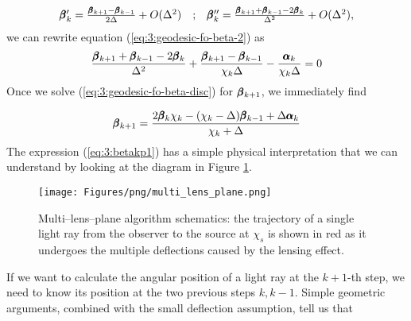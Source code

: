 \begin{equation}
\label{eq:3:finitediff}
\begin{matrix}
\pmb{\beta}'_k = \frac{\pmb{\beta}_{k+1}-\pmb{\beta}_{k-1}}{2\Delta} + O(\Delta^2) & ; & \pmb{\beta}''_k = \frac{\pmb{\beta}_{k+1}+\pmb{\beta}_{k-1}-2\pmb{\beta}_k}{\Delta^2} + O(\Delta^2),
\end{matrix}
\end{equation}
%
we can rewrite equation (\ref{eq:3:geodesic-fo-beta-2}) as 
\begin{equation}
\label{eq:3:geodesic-fo-beta-disc}
\frac{\pmb{\beta}_{k+1}+\pmb{\beta}_{k-1}-2\pmb{\beta}_k}{\Delta^2} + \frac{\pmb{\beta}_{k+1}-\pmb{\beta}_{k-1}}{\chi_k\Delta} - \frac{\pmb{\alpha}_k}{\chi_k\Delta} = 0
\end{equation} 
%
Once we solve (\ref{eq:3:geodesic-fo-beta-disc}) for $\pmb{\beta}_{k+1}$, we immediately find

\begin{equation}
\label{eq:3:betakp1}
\pmb{\beta}_{k+1} = \frac{2\pmb{\beta}_k\chi_k-(\chi_k-\Delta)\pmb{\beta}_{k-1}+\Delta\pmb{\alpha}_k}{\chi_k+\Delta}
\end{equation}  
%
The expression (\ref{eq:3:betakp1}) has a simple physical interpretation that we can understand by looking at the diagram in Figure \ref{fig:3:multi-lens-plane}.
\begin{figure}
\begin{center}
\texttt{[image: Figures/png/multi\_lens\_plane.png]}
\end{center}
\caption{Multi--lens--plane algorithm schematics: the trajectory of a single light ray from the observer to the source at $\chi_s$ is shown in red as it undergoes the multiple deflections caused by the lensing effect.}
\label{fig:3:multi-lens-plane}
\end{figure}
%
If we want to calculate the angular position of a light ray at the $k+1$-th step, we need to know its position at the two previous steps $k,k-1$. Simple geometric arguments, combined with the small deflection assumption, tell us that 

